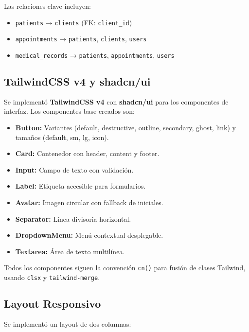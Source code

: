 \documentclass[12pt,a4paper]{article}
\begin{document}
Las relaciones clave incluyen:

\begin{itemize}[leftmargin=*]
    \item \texttt{patients} → \texttt{clients} (FK: \texttt{client\_id})
    \item \texttt{appointments} → \texttt{patients}, \texttt{clients}, \texttt{users}
    \item \texttt{medical\_records} → \texttt{patients}, \texttt{appointments}, \texttt{users}
\end{itemize}

\subsection{TailwindCSS v4 y shadcn/ui}

Se implementó \textbf{TailwindCSS v4} con \textbf{shadcn/ui} para los componentes
de interfaz. Los componentes base creados son:

\begin{itemize}[leftmargin=*]
    \item \textbf{Button:} Variantes (default, destructive, outline, secondary,
          ghost, link) y tamaños (default, sm, lg, icon).
    \item \textbf{Card:} Contenedor con header, content y footer.
    \item \textbf{Input:} Campo de texto con validación.
    \item \textbf{Label:} Etiqueta accesible para formularios.
    \item \textbf{Avatar:} Imagen circular con fallback de iniciales.
    \item \textbf{Separator:} Línea divisoria horizontal.
    \item \textbf{DropdownMenu:} Menú contextual desplegable.
    \item \textbf{Textarea:} Área de texto multilínea.
\end{itemize}

Todos los componentes siguen la convención \texttt{cn()} para fusión de clases
Tailwind, usando \texttt{clsx} y \texttt{tailwind-merge}.

\subsection{Layout Responsivo}

Se implementó un layout de dos columnas:
\end{document}
